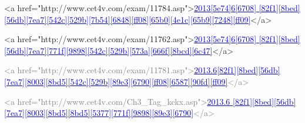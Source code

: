 \documentclass[12pt]{article}
\begin{document}
<a href="http://www.cet4v.com/exam/11784.asp">\textcolor{blue}{{\uline{2013[5e74]6[6708] [82f1][8bed][56db][7ea7][542c][529b][7b54][6848][ff08][65b0][4e1c][65b9][7248][ff09]}}}</a>
\vspace{0.00mm}

\vspace{0.00mm}
\setlength{\parindent}{0.00mm}
\setlength{\leftskip}{-6.23mm}
\setlength{\rightskip}{0.00mm}

<a href="http://www.cet4v.com/exam/11762.asp">\textcolor{blue}{{\uline{2013[5e74]6[6708] [82f1][8bed][56db][7ea7][771f][9898][542c][529b][573a][666f][8bcd][6c47]}}}</a>
\vspace{0.00mm}

\vspace{0.00mm}
\setlength{\parindent}{0.00mm}
\setlength{\leftskip}{-6.23mm}
\setlength{\rightskip}{0.00mm}

\textcolor{gray}{{}}\textcolor{gray}{{}}\textcolor{gray}{{}}\textcolor{gray}{{<a href="http://www.cet4v.com/exam/11781.asp">}}\textcolor{blue}{{\uline{2013.6[82f1][8bed][56db][7ea7][8003][8bd5][542c][529b][89e3][6790][ff08][6587][90fd][ff09]}}}\textcolor{gray}{{</a>}}\textcolor{gray}{{}}
\vspace{0.00mm}

\vspace{0.00mm}
\setlength{\parindent}{0.00mm}
\setlength{\leftskip}{-6.23mm}
\setlength{\rightskip}{0.00mm}

\textcolor{gray}{{}}\textcolor{gray}{{}}\textcolor{gray}{{}}\textcolor{gray}{{<a href="http://www.cet4v.com/Ch3_Tag_kckx.asp">}}\textcolor{blue}{{\uline{2013.6 [82f1][8bed][56db][7ea7][8003][8bd5][8bd5][5377][771f][9898][89e3][6790]}}}\textcolor{gray}{{</a>}}\textcolor{red}{{\textbf{}}}
\vspace{0.00mm}

\vspace{0.00mm}
\setlength{\parindent}{0.00mm}
\setlength{\leftskip}{0.00mm}
\setlength{\rightskip}{0.00mm}


\vspace{0.00mm}

\vspace{0.00mm}
\setlength{\parindent}{0.00mm}
\setlength{\leftskip}{0.00mm}
\setlength{\rightskip}{0.00mm}


\vspace{0.00mm}

\vspace{0.00mm}
\setlength{\parindent}{0.00mm}
\setlength{\leftskip}{0.00mm}
\setlength{\rightskip}{0.00mm}
\end{document}
